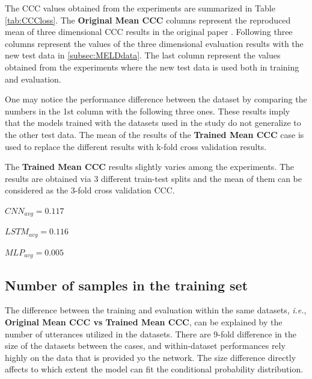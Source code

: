 \documentclass[a4paper,11pt]{article}
\begin{document}
\indent The CCC values obtained from the experiments are summarized in Table \ref{tab:CCCloss}. The \textbf{Original Mean CCC} columns represent the reproduced mean of three dimensional CCC results in the original paper \cite{atmaja2020deep}. Following three columns represent the values of the three dimensional evaluation results with the new test data in \ref{subsec:MELDdata}. The last column represent the values obtained from the experiments where the new test data is used both in training and evaluation.

One may notice the performance difference between the dataset by comparing the numbers in the 1st column with the following three ones. These results imply that the models trained with the datasets used in the study do not generalize to the other test data. The mean of the results of the \textbf{Trained Mean CCC} case is used to replace the different results with k-fold cross validation results. 

The  \textbf{Trained Mean CCC} results slightly varies among the experiments. The results are obtained via 3 different train-test splits and the mean of them can be considered as the 3-fold cross validation CCC. \\

\begin{minipage}{0.3\textwidth}
    \centering
    $CNN_{avg} = 0.117$            
\end{minipage}
\begin{minipage}{0.3\textwidth}
    \centering
    $LSTM_{avg} = 0.116$             
\end{minipage}
\begin{minipage}{0.3\textwidth}
    \centering
   $MLP_{avg} = 0.005$ 
\end{minipage}

\pagebreak 

\subsection{Number of samples in the training set}
The difference between the training and evaluation within the same datasets, \textit{i.e.}, \textbf{Original Mean CCC vs Trained Mean CCC}, can be explained by the number of utterances utilized in the datasets. There are 9-fold difference in the size of the datasets between the cases, and within-dataset performances rely highly on the data that is provided yo the network. The size difference directly affects to which extent the model can fit the conditional probability distribution.
\end{document}
